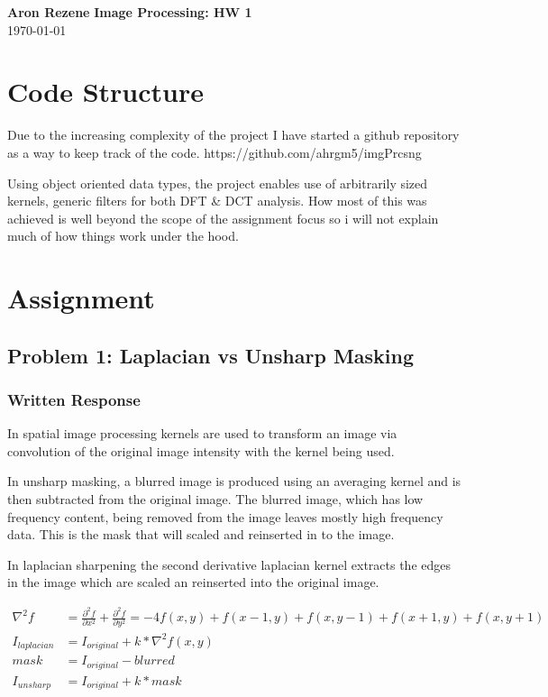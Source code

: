 \documentclass[11pt]{article}
\begin{document}
\noindent \textbf{Aron Rezene} \hfill \textbf{Image Processing: HW 1} \\
\noindent \today
\vspace{-5pt}
\vspace{1pt}   


\section{Code Structure}
Due to the increasing complexity of the project I have started a github repository as a way to keep track of the code. https://github.com/ahrgm5/imgPrcsng

Using object oriented data types, the project enables use of arbitrarily sized kernels, generic filters for both DFT \& DCT analysis. How most of this was achieved is well beyond the scope of the assignment focus so i will not explain much of how things work under the hood. 

\section{Assignment}


\subsection{Problem 1: Laplacian vs Unsharp Masking}
\subsubsection{Written Response}

In spatial image processing kernels are used to transform an image via convolution of the original image intensity with the kernel being used.

In unsharp masking, a blurred image is produced using an averaging kernel and is then subtracted from the original image. The blurred image, which has low frequency content, being removed from the image leaves mostly high frequency data. This is the mask that will scaled and reinserted in to the image. 

In laplacian sharpening the second derivative laplacian kernel extracts the edges in the image which are scaled an reinserted into the original image.

\begin{align*}
	\nabla ^{2} f &= \frac{\partial^{2} f}{\partial x^{2}} + \frac{\partial^{2} f}{\partial y^{2}} = -4f(x,y) + f(x-1,y) + f(x,y-1) + f(x+1,y) + f(x,y+1) \\
	I_{laplacian} &= I_{original} + k * \nabla ^{2} f(x,y) \\[1em]
	mask &= I_{original} - blurred \\ 
	I_{unsharp} &= I_{original} + k * mask
\end{align*}
\end{document}
